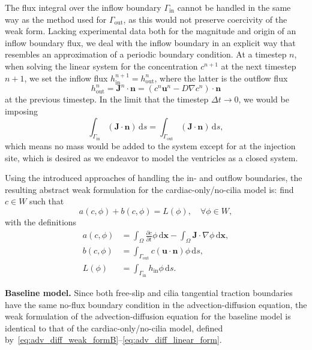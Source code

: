 \documentclass[fleqn]{wlscirep}
\newcommand{\pdifft}[1]{\frac{\partial  #1}{\partial t}}
\newcommand{\intO}[1]{\int_{\Omega}#1 \, \mathrm d\bm{x}}
\newcommand{\intGin}[1]{\int_{\Gamma_{\mathrm{in}}}#1 \, \mathrm ds}
\newcommand{\intGout}[1]{\int_{\Gamma_{\mathrm{out}}}#1 \, \mathrm ds}
\newcommand{\Gin}{\Gamma_{\mathrm{in}}}
\newcommand{\Gout}{\Gamma_{\mathrm{out}}}
\newcommand{\nn}{\mathbf{n}}
\newcommand{\uu}{\mathbf{u}}
\newcommand{\JJ}{\mathbf{J}}
\begin{document}
The flux integral over the inflow boundary $\Gin$ cannot be handled
in the same way as the method used for $\Gout$, as this would not preserve
coercivity of the weak form. Lacking experimental data both for the magnitude and
origin of an inflow boundary flux, we deal with the inflow boundary in an explicit
way that resembles an approximation of a periodic boundary condition. At a timestep $n$,
when solving the linear system for the concentration $c^{n+1}$ at the next timestep $n+1$,
we set the inflow flux $h_{\mathrm{in}}^{n+1} = h_{\mathrm{out}}^{n}$, where the latter is the outflow flux
\begin{equation*}
    h_{\mathrm{out}}^{n} = \JJ^n\cdot\nn = (c^n\uu^n - D\nabla c^n)\cdot\nn
\end{equation*}
at the previous timestep. In the limit that the timestep $\Delta t\to 0$, we would be imposing
\begin{equation*}
    \intGin{(\JJ\cdot\nn)} = \intGout{(\JJ\cdot\nn)},
\end{equation*}
which means no mass would be added to the system except for at the injection site,
which is desired as we endeavor to model the ventricles as a closed system.

Using the introduced approaches of handling the in- and outflow boundaries,
the resulting abstract weak formulation for the cardiac-only/no-cilia model is:
find $c\in W$ such that
\begin{equation}
    a(c, \phi) + b(c, \phi) = L(\phi), \quad\forall\phi\in W, \label{eq:adv_diff_weak_formB}
\end{equation}
with the definitions
\begin{align}
    a(c, \phi) &= \intO{\pdifft{c}\phi} - \intO{\JJ\cdot\nabla\phi}, \label{eq:adv_diff_bilinear_form}\\
    b(c, \phi) &= \intGout{c(\uu\cdot\nn)\phi}, \label{eq:adv_diff_skew_form} \\
    L(\phi) &= \intGin{h_{\mathrm{in}}\phi}.\label{eq:adv_diff_linear_form}
\end{align}

\textbf{Baseline model.} Since both free-slip and cilia tangential
traction boundaries have the same no-flux boundary condition
in the advection-diffusion equation, the weak formulation of
the advection-diffusion equation for the baseline model is
identical to that of the cardiac-only/no-cilia model,
defined by~\eqref{eq:adv_diff_weak_formB}--\eqref{eq:adv_diff_linear_form}.
\end{document}
